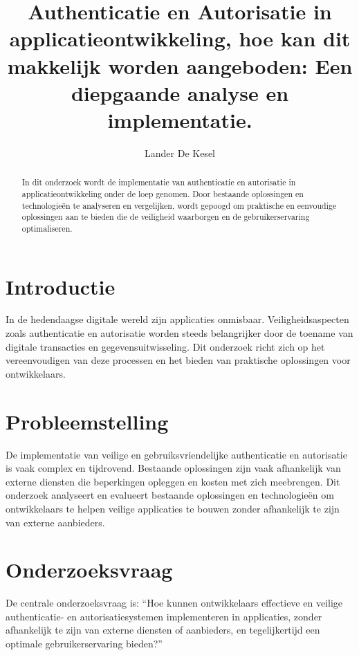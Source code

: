 \documentclass[a0,portrait]{hogent-poster}
\title{Authenticatie en Autorisatie in applicatieontwikkeling, hoe kan dit makkelijk worden aangeboden: Een diepgaande analyse en implementatie.}
\author{Lander De Kesel}
\begin{document}
\maketitle

\begin{abstract}
  In dit onderzoek wordt de implementatie van authenticatie en autorisatie in applicatieontwikkeling onder de loep genomen. 
  Door bestaande oplossingen en technologieën te analyseren en vergelijken, wordt gepoogd om praktische en eenvoudige oplossingen
  aan te bieden die de veiligheid waarborgen en de gebruikerservaring optimaliseren.
\end{abstract}

\begin{multicols}{2} %


\section{Introductie}

In de hedendaagse digitale wereld zijn applicaties onmisbaar. Veiligheidsaspecten zoals authenticatie en autorisatie worden steeds 
belangrijker door de toename van digitale transacties en gegevensuitwisseling. Dit onderzoek richt zich op het vereenvoudigen van deze
processen en het bieden van praktische oplossingen voor ontwikkelaars.

\section{Probleemstelling}

De implementatie van veilige en gebruiksvriendelijke authenticatie en autorisatie is vaak complex en tijdrovend. Bestaande oplossingen zijn
vaak afhankelijk van externe diensten die beperkingen opleggen en kosten met zich meebrengen. Dit onderzoek analyseert en evalueert bestaande
oplossingen en technologieën om ontwikkelaars te helpen veilige applicaties te bouwen zonder afhankelijk te zijn van externe aanbieders.

\section{Onderzoeksvraag}

De centrale onderzoeksvraag is: ``Hoe kunnen ontwikkelaars effectieve en veilige authenticatie- en autorisatiesystemen implementeren in applicaties,
zonder afhankelijk te zijn van externe diensten of aanbieders, en tegelijkertijd een optimale gebruikerservaring bieden?''


\end{multicols}
\end{document}
